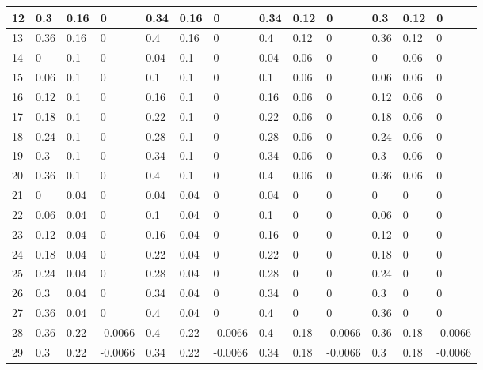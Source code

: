 \begin{footnotesize}
\begin{longtable}{|l|l|l|l|l|l|l|l|l|l|l|l|l|}
12  & 0.3  & 0.16 & 0       & 0.34 & 0.16 & 0       & 0.34 & 0.12 & 0       & 0.3  & 0.12 & 0       \\ \hline
13  & 0.36 & 0.16 & 0       & 0.4  & 0.16 & 0       & 0.4  & 0.12 & 0       & 0.36 & 0.12 & 0       \\ \hline
14  & 0    & 0.1  & 0       & 0.04 & 0.1  & 0       & 0.04 & 0.06 & 0       & 0    & 0.06 & 0       \\ \hline
15  & 0.06 & 0.1  & 0       & 0.1  & 0.1  & 0       & 0.1  & 0.06 & 0       & 0.06 & 0.06 & 0       \\ \hline
16  & 0.12 & 0.1  & 0       & 0.16 & 0.1  & 0       & 0.16 & 0.06 & 0       & 0.12 & 0.06 & 0       \\ \hline
17  & 0.18 & 0.1  & 0       & 0.22 & 0.1  & 0       & 0.22 & 0.06 & 0       & 0.18 & 0.06 & 0       \\ \hline
18  & 0.24 & 0.1  & 0       & 0.28 & 0.1  & 0       & 0.28 & 0.06 & 0       & 0.24 & 0.06 & 0       \\ \hline
19  & 0.3  & 0.1  & 0       & 0.34 & 0.1  & 0       & 0.34 & 0.06 & 0       & 0.3  & 0.06 & 0       \\ \hline
20  & 0.36 & 0.1  & 0       & 0.4  & 0.1  & 0       & 0.4  & 0.06 & 0       & 0.36 & 0.06 & 0       \\ \hline
21  & 0    & 0.04 & 0       & 0.04 & 0.04 & 0       & 0.04 & 0    & 0       & 0    & 0    & 0       \\ \hline
22  & 0.06 & 0.04 & 0       & 0.1  & 0.04 & 0       & 0.1  & 0    & 0       & 0.06 & 0    & 0       \\ \hline
23  & 0.12 & 0.04 & 0       & 0.16 & 0.04 & 0       & 0.16 & 0    & 0       & 0.12 & 0    & 0       \\ \hline
24  & 0.18 & 0.04 & 0       & 0.22 & 0.04 & 0       & 0.22 & 0    & 0       & 0.18 & 0    & 0       \\ \hline
25  & 0.24 & 0.04 & 0       & 0.28 & 0.04 & 0       & 0.28 & 0    & 0       & 0.24 & 0    & 0       \\ \hline
26  & 0.3  & 0.04 & 0       & 0.34 & 0.04 & 0       & 0.34 & 0    & 0       & 0.3  & 0    & 0       \\ \hline
27  & 0.36 & 0.04 & 0       & 0.4  & 0.04 & 0       & 0.4  & 0    & 0       & 0.36 & 0    & 0       \\ \hline
28  & 0.36 & 0.22 & -0.0066 & 0.4  & 0.22 & -0.0066 & 0.4  & 0.18 & -0.0066 & 0.36 & 0.18 & -0.0066 \\ \hline
29  & 0.3  & 0.22 & -0.0066 & 0.34 & 0.22 & -0.0066 & 0.34 & 0.18 & -0.0066 & 0.3  & 0.18 & -0.0066 \\ \hline

\end{longtable}
\end{footnotesize}
